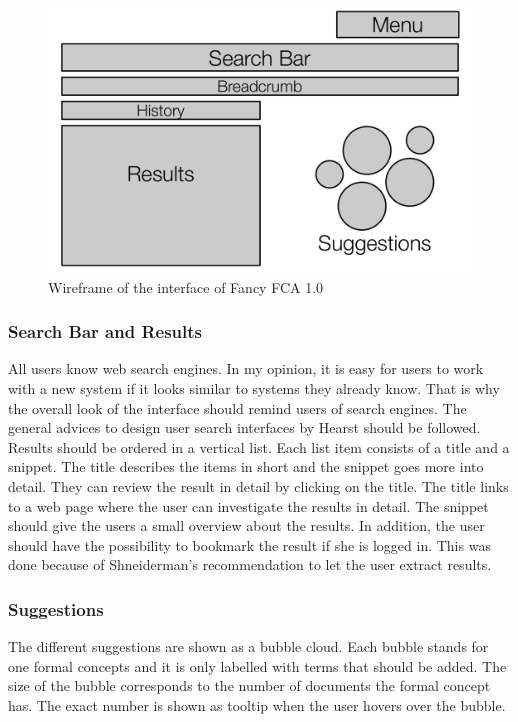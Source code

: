 \documentclass[11pt]{report}
\begin{document}
\begin{figure}[!ht]
	\centering
	\includegraphics[width=\linewidth]{images/schema}
\caption{Wireframe of the interface of Fancy FCA 1.0}
\label{figure:schema}
\end{figure}

\subsubsection{Search Bar and Results}

All users know web search engines. In my opinion, it is easy for users to work with a new system if it looks similar to systems they already know. That is why the overall look of the interface should remind users of search engines. The general advices to design user search interfaces by Hearst \cite{Hearst2009} should be followed. Results should be ordered in a vertical list. Each list item consists of a title and a snippet. The title describes the items in short and the snippet goes more into detail. They can review the result in detail by clicking on the title. The title links to a web page where the user can investigate the results in detail. The snippet should give the users a small overview about the results. In addition, the user should have the possibility to bookmark the result if she is logged in. This was done because of Shneiderman's recommendation to let the user extract results.

\subsubsection{Suggestions}

The different suggestions are shown as a bubble cloud. Each bubble stands for one formal concepts and it is only labelled with terms that should be added. The size of the bubble corresponds to the number of documents the formal concept has. The exact number is shown as tooltip when the user hovers over the bubble.
\end{document}
